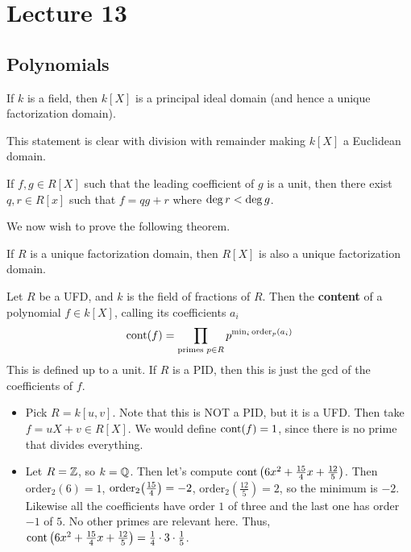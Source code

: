 \section{Lecture 13}
\subsection{Polynomials}
\begin{theorem}
If $k$ is a field, then $k[X]$ is a principal ideal domain (and hence a unique factorization domain).
\end{theorem}
This statement is clear with division with remainder making $k[X]$ a Euclidean domain.
\begin{theorem}
    If $f, g \in R[X]$ such that the leading coefficient of $g$ is a unit,
    then there exist $q, r \in R[x]$ such that $f = qg + r$ where $\operatorname{deg} r < \operatorname{deg} g$.
\end{theorem}

We now wish to prove the following theorem.

\begin{theorem}
    If $R$ is a unique factorization domain, then $R[X]$ is also a unique factorization domain.
\end{theorem}

\begin{definition}
    Let $R$ be a UFD, and $k$ is the field of fractions of $R$.
    Then the \textbf{content} of a polynomial $f \in k[X]$, calling its coefficients $a_i$
    \begin{align*}
        \operatorname{cont}(f) = \prod_{\text{primes } p \in R} p^{\min_i \text{order}_p (a_i)}
    \end{align*}
    This is defined up to a unit.
    If $R$ is a PID, then this is just the gcd of the coefficients of $f$.
\end{definition}

\begin{example}
    \begin{itemize}
    \item Pick $R = k[u, v]$. Note that this is NOT a PID, but it is a UFD.
    Then take $f = uX + v \in R[X]$. We would define $\operatorname{cont}(f) = 1$, since there is no prime that divides everything.
    \item Let $R = \operatorname{\mathbb{Z}}$, so $k = \operatorname{\mathbb{Q}}$. Then let's compute $\operatorname{cont}\qty(6x^2 + \frac{15}{4}x + \frac{12}{5})$.
    Then $\text{order}_2(6) = 1$, $\text{order}_2\qty(\frac{15}{4}) = -2$, $\text{order}_2(\frac{12}{5}) = 2$,
    so the minimum is $-2$. Likewise all the coefficients have order $1$ of three and the last one has order $-1$ of $5$. No other primes are relevant here.
    Thus, $\operatorname{cont}\qty(6x^2 + \frac{15}{4}x + \frac{12}{5}) = \frac{1}{4} \cdot 3 \cdot \frac{1}{5}$.
    \end{itemize}
\end{example}

